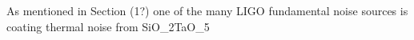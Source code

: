 As mentioned in Section (1?) one of the many LIGO fundamental noise sources is coating thermal noise from SiO_{2}TaO_{5}
